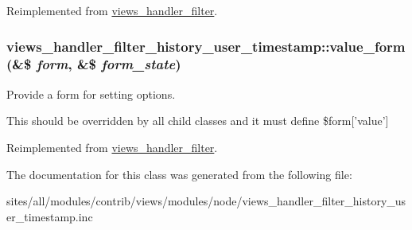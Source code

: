 Reimplemented from \hyperlink{classviews__handler__filter_8e513b3abbc2559f37b550ca4957b4ae}{views\_\-handler\_\-filter}.\hypertarget{classviews__handler__filter__history__user__timestamp_38401d36304bef8a19184a8e7919427f}{
\subsubsection[{value\_\-form}]{\setlength{\rightskip}{0pt plus 5cm}views\_\-handler\_\-filter\_\-history\_\-user\_\-timestamp::value\_\-form (\&\$ {\em form}, \/  \&\$ {\em form\_\-state})}}
\label{classviews__handler__filter__history__user__timestamp_38401d36304bef8a19184a8e7919427f}


Provide a form for setting options.

This should be overridden by all child classes and it must define \$form\mbox{[}'value'\mbox{]} 

Reimplemented from \hyperlink{classviews__handler__filter_9168b39edae84b20e01a3fd0d810ba66}{views\_\-handler\_\-filter}.

The documentation for this class was generated from the following file:\begin{CompactItemize}
\item 
sites/all/modules/contrib/views/modules/node/views\_\-handler\_\-filter\_\-history\_\-user\_\-timestamp.inc\end{CompactItemize}
